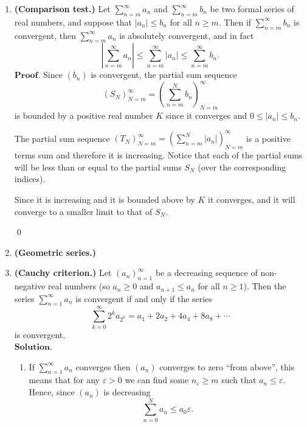 \documentclass{article}
\theoremstyle{remark}
\begin{document}
\begin{enumerate}
    \item \textbf{(Comparison test.)}
    Let $\sum_{n=m}^{\infty} a_n$ and $\sum_{n=m}^{\infty} b_n$ be two formal series of real numbers, and suppose that $|a_n| \leq b_n$ for all $n \geq m$. Then if $\sum_{n=m}^{\infty} b_n$ is convergent, then $\sum_{n=m}^{\infty} a_n$ is absolutely convergent, and in fact
    \[
    \left| \sum_{n=m}^{\infty} a_n \right| \leq \sum_{n=m}^{\infty} |a_n| \leq \sum_{n=m}^{\infty} b_n.
    \]
    $\textbf{Proof.}$
    Since $(b_n)$ is convergent, the partial sum sequence
    \[
    (S_N)_{N=m}^{\infty} = \left(\sum_{n=m}^{N} b_n\right)_{N=m}^{\infty} 
    \]
    is bounded by a positive real number $K$ since it converges and
    $0 \leq \vert a_n \vert \leq b_n$.

    The partial sum sequence \( (T_N)_{N=m}^{\infty} =  \left(\sum_{n=m}^{N} \vert a_n\vert \right)_{N=m}^{\infty} \) is a positive terms sum and therefore it is increasing.
    Notice that each of the partial sums will be less than or equal to the partial sums $S_N$ (over the corresponding indices).
    
    Since it is increasing and it is bounded above by $K$ it converges, and it will converge to a smaller limit to that of $S_N$.
    \begin{flushright}
        \qed
    \end{flushright}
    \item \textbf{(Geometric series.)}
    
    \item \textbf{(Cauchy criterion.)}
    Let $(a_n)_{n=1}^{\infty}$ be a decreasing sequence of non-negative real numbers (so $a_n \geq 0$ and $a_{n+1} \leq a_n$ for all $n \geq 1$). Then the series $\sum_{n=1}^{\infty} a_n$ is convergent if and only if the series
    \[
    \sum_{k=0}^{\infty} 2^k a_{2^k} = a_1 + 2a_2 + 4a_4 + 8a_8 + \dotsb
    \]
    is convergent.\\
    $\textbf{Solution.}$
    \begin{enumerate}
        \item[$(\implies)$]
        If $\sum_{n=1}^{\infty}a_n$ converges then $(a_n)$ converges to zero ``from above'', 
        this means that for any $\varepsilon > 0$ we can find some $n_{\varepsilon} \geq m$ such that $a_n \leq \varepsilon$.
        Hence, since $(a_n)$ is decreasing
        \[
        \sum_{n=0}^{N} a_n \leq a_{0}\varepsilon.
        \]


\end{enumerate}
\end{enumerate}
\end{document}
